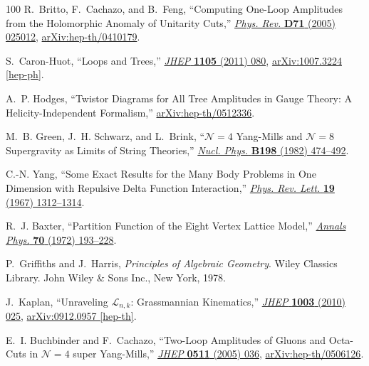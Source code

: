 \documentclass[12pt,hyperref,compress]{JHEP3}
\begin{document}
\begin{thebibliography}{100}
R.~Britto, F.~Cachazo, and B.~Feng, ``{Computing One-Loop Amplitudes from the
  Holomorphic Anomaly of Unitarity Cuts},''
  \href{http://dx.doi.org/10.1103/PhysRevD.71.025012}{{\em Phys. Rev.} {\bf
  D71} (2005)  025012},
\href{http://arxiv.org/abs/hep-th/0410179}{{ arXiv:hep-th/0410179}}.

S.~Caron-Huot, ``{Loops and Trees},''
  \href{http://dx.doi.org/10.1007/JHEP05(2011)080}{{\em JHEP} {\bf 1105} (2011)
   080},
\href{http://arxiv.org/abs/1007.3224}{{ arXiv:1007.3224 [hep-ph]}}.

A.~P. Hodges, ``{Twistor Diagrams for All Tree Amplitudes in Gauge Theory: A
  Helicity-Independent Formalism},''
\href{http://arxiv.org/abs/hep-th/0512336}{{ arXiv:hep-th/0512336}}.

M.~B. Green, J.~H. Schwarz, and L.~Brink, ``{$\mathcal{N}\!=\!4$ Yang-Mills and
  $\mathcal{N}\!=\!8$ Supergravity as Limits of String Theories},''
\href{http://dx.doi.org/10.1016/0550-3213(82)90336-4}{{\em Nucl. Phys.} {\bf
  B198} (1982)  474--492}.

C.-N. Yang, ``{Some Exact Results for the Many Body Problems in One Dimension
  with Repulsive Delta Function Interaction},''
\href{http://dx.doi.org/10.1103/PhysRevLett.19.1312}{{\em Phys. Rev. Lett.}
  {\bf 19} (1967)  1312--1314}.

R.~J. Baxter, ``{Partition Function of the Eight Vertex Lattice Model},''
\href{http://dx.doi.org/10.1016/0003-4916(72)90335-1}{{\em Annals Phys.} {\bf
  70} (1972)  193--228}.

P.~Griffiths and J.~Harris, {\em {Principles of Algebraic Geometry}}.
\newblock Wiley Classics Library. John Wiley \& Sons Inc., New York, 1978.

J.~Kaplan, ``{Unraveling $\mathcal{L}_{n,k}$: Grassmannian Kinematics},''
  \href{http://dx.doi.org/10.1007/JHEP03(2010)025}{{\em JHEP} {\bf 1003} (2010)
   025},
\href{http://arxiv.org/abs/0912.0957}{{ arXiv:0912.0957 [hep-th]}}.

E.~I. Buchbinder and F.~Cachazo, ``{Two-Loop Amplitudes of Gluons and Octa-Cuts
  in $\mathcal{N}\!=\!4$ super Yang-Mills},''
  \href{http://dx.doi.org/10.1088/1126-6708/2005/11/036}{{\em JHEP} {\bf 0511}
  (2005)  036},
\href{http://arxiv.org/abs/hep-th/0506126}{{ arXiv:hep-th/0506126}}.


\end{thebibliography}
\end{document}
